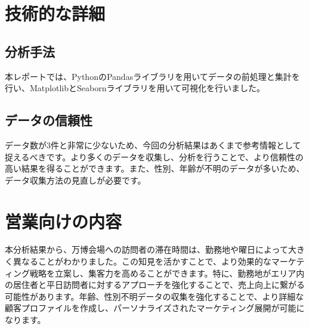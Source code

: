 \documentclass[11pt,a4paper]{article}
\begin{document}
\section{技術的な詳細}

\subsection{分析手法}

本レポートでは、PythonのPandasライブラリを用いてデータの前処理と集計を行い、MatplotlibとSeabornライブラリを用いて可視化を行いました。

\subsection{データの信頼性}

データ数が3件と非常に少ないため、今回の分析結果はあくまで参考情報として捉えるべきです。より多くのデータを収集し、分析を行うことで、より信頼性の高い結果を得ることができます。また、性別、年齢が不明のデータが多いため、データ収集方法の見直しが必要です。

\section{営業向けの内容}

本分析結果から、万博会場への訪問者の滞在時間は、勤務地や曜日によって大きく異なることがわかりました。この知見を活かすことで、より効果的なマーケティング戦略を立案し、集客力を高めることができます。特に、勤務地がエリア内の居住者と平日訪問者に対するアプローチを強化することで、売上向上に繋がる可能性があります。年齢、性別不明データの収集を強化することで、より詳細な顧客プロファイルを作成し、パーソナライズされたマーケティング展開が可能になります。
\end{document}
